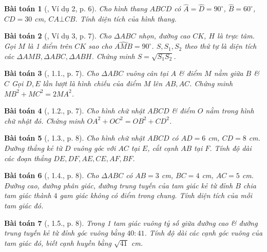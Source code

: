 \documentclass{article}
\newtheorem{baitoan}{Bài toán}
\begin{document}
\begin{baitoan}[\cite{TLCT_THCS_Toan_9_hinh_hoc}, Ví dụ 2, p. 6]
	Cho hình thang $ABCD$ có $\widehat{A} = \widehat{D} = 90^\circ$, $\widehat{B} = 60^\circ$, $CD = 30$ \emph{cm}, $CA\bot CB$. Tính diện tích của hình thang.
\end{baitoan}

\begin{baitoan}[\cite{TLCT_THCS_Toan_9_hinh_hoc}, Ví dụ 3, p. 7]
	Cho $\Delta ABC$ nhọn, đường cao $CK$, $H$ là trực tâm. Gọi $M$ là 1 điểm trên $CK$ sao cho $\widehat{AMB} = 90^\circ$. $S,S_1,S_2$ theo thứ tự là diện tích các $\Delta AMB,\Delta ABC,\Delta ABH$. Chứng minh $S = \sqrt{S_1S_2}$.
\end{baitoan}

\begin{baitoan}[\cite{TLCT_THCS_Toan_9_hinh_hoc}, 1.1., p. 7]
	Cho $\Delta ABC$ vuông cân tại $A$ \& điểm $M$ nằm giữa $B$ \& $C$ Gọi $D,E$ lần lượt là hình chiếu của điểm $M$ lên $AB,AC$. Chứng minh $MB^2 + MC^2 = 2MA^2$.
\end{baitoan}

\begin{baitoan}[\cite{TLCT_THCS_Toan_9_hinh_hoc}, 1.2., p. 7]
	Cho hình chữ nhật $ABCD$ \& điểm $O$ nằm trong hình chữ nhật đó. Chứng minh $OA^2 + OC^2 = OB^2 + CD^2$.
\end{baitoan}

\begin{baitoan}[\cite{TLCT_THCS_Toan_9_hinh_hoc}, 1.3., p. 8]
	Cho hình chữ nhật $ABCD$ có $AD = 6$ \emph{cm}, $CD = 8$ \emph{cm}. Đường thẳng kẻ từ $D$ vuông góc với $AC$ tại $E$, cắt cạnh $AB$ tại $F$. Tính độ dài các đoạn thẳng $DE,DF,AE,CE,AF,BF$.
\end{baitoan}

\begin{baitoan}[\cite{TLCT_THCS_Toan_9_hinh_hoc}, 1.4., p. 8]
	Cho $\Delta ABC$ có $AB = 3$  \emph{cm}, $BC = 4$ \emph{cm}, $AC = 5$ \emph{cm}. Đường cao, đường phân giác, đường trung tuyến của tam giác kẻ từ đỉnh $B$ chia tam giác thành $4$ gam giác không có điểm trong chung. Tính diện tích của mỗi tam giác đó.
\end{baitoan}

\begin{baitoan}[\cite{TLCT_THCS_Toan_9_hinh_hoc}, 1.5., p. 8]
	Trong 1 tam giác vuông tỷ số giữa đường cao \& đường trung tuyến kẻ từ đỉnh góc vuông bằng $40:41$. Tính độ dài các cạnh góc vuông của tam giác đó, biết cạnh huyền bằng $\sqrt{41}$ \emph{cm}.
\end{baitoan}
\end{document}
